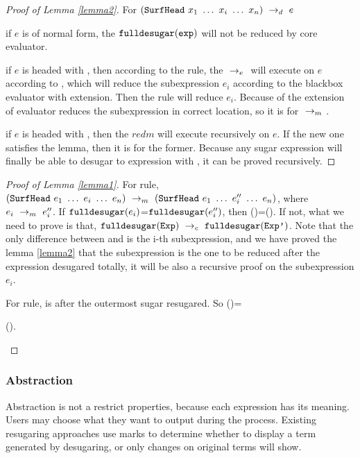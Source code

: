 \begin{proof}[Proof of Lemma \ref{lemma2}]
For $(\mbox{\tt SurfHead}~x_1~\ldots~x_i~\ldots~x_n) ~\rightarrow_d~ e$

if $e$ is of normal form, the $\mbox{\tt fulldesugar}(\mbox{\tt exp})$ will not be reduced by core evaluator.

if $e$ is headed with , then according to the  rule, the $~\rightarrow_e~$ will execute on $e$ according to , which will reduce the subexpression $e_i$ according to the blackbox evaluator with extension. Then the  rule will reduce $e_i$. Because of the extension of evaluator reduces the subexpression in correct location, so it is for $~\rightarrow_m~$.

if $e$ is headed with , then the $redm{}{}$ will execute recursively on $e$. If the new one satisfies the lemma, then it is for the former. Because any sugar expression will finally be able to desugar to expression with , it can be proved recursively.
\end{proof}
\begin{proof}[Proof of Lemma \ref{lemma1}]
\hfill

For  rule, $(\mbox{\tt SurfHead}~e_1~\ldots~e_i~\ldots~e_n) ~\rightarrow_m~(\mbox{\tt SurfHead}~e_1~\ldots~e_i''~\ldots~e_n)$, where $e_i ~\rightarrow_m~e_i''$. 
If $\mbox{\tt fulldesugar}(e_i)$=$\mbox{\tt fulldesugar}(e_i'')$, then ()=(). If not,  what we need to prove is that, $\mbox{\tt fulldesugar}(\mbox{\tt Exp}) ~\rightarrow_c~\mbox{\tt fulldesugar}(\mbox{\tt Exp'})$. Note that the only difference between  and  is the i-th subexpression, and we have proved the lemma \ref{lemma2} that the subexpression is the one to be reduced after the expression desugared totally, it will be also a recursive proof on the subexpression $e_i$.

For  rule,  is  after the outermost sugar resugared. So ()=

\begin{flushleft}
().
\end{flushleft}

\end{proof}

\subsubsection{Abstraction}
Abstraction is not a restrict properties, because each expression has its meaning. Users may choose what they want to output during the process. Existing resugaring approaches use marks to determine whether to display a term generated by desugaring, or only changes on original terms will show.

